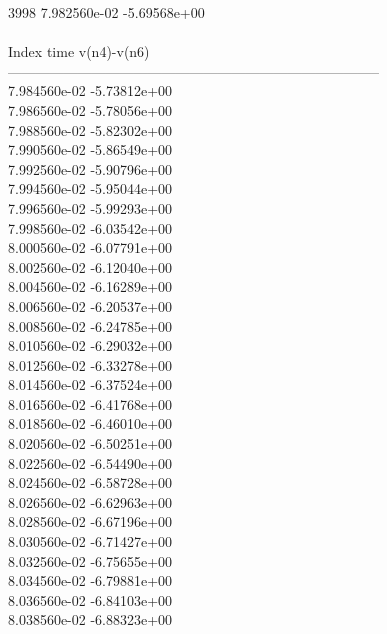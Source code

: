 3998	7.982560e-02	-5.69568e+00	\\ \hline
\\ \hline
Index   time            v(n4)-v(n6)     \\ \hline
--------------------------------------------------------------------------------\\ 	7.984560e-02	-5.73812e+00	\\ 	7.986560e-02	-5.78056e+00	\\ 	7.988560e-02	-5.82302e+00	\\ 	7.990560e-02	-5.86549e+00	\\ 	7.992560e-02	-5.90796e+00	\\ 	7.994560e-02	-5.95044e+00	\\ 	7.996560e-02	-5.99293e+00	\\ 	7.998560e-02	-6.03542e+00	\\ 	8.000560e-02	-6.07791e+00	\\ 	8.002560e-02	-6.12040e+00	\\ 	8.004560e-02	-6.16289e+00	\\ 	8.006560e-02	-6.20537e+00	\\ 	8.008560e-02	-6.24785e+00	\\ 	8.010560e-02	-6.29032e+00	\\ 	8.012560e-02	-6.33278e+00	\\ 	8.014560e-02	-6.37524e+00	\\ 	8.016560e-02	-6.41768e+00	\\ 	8.018560e-02	-6.46010e+00	\\ 	8.020560e-02	-6.50251e+00	\\ 	8.022560e-02	-6.54490e+00	\\ 	8.024560e-02	-6.58728e+00	\\ 	8.026560e-02	-6.62963e+00	\\ 	8.028560e-02	-6.67196e+00	\\ 	8.030560e-02	-6.71427e+00	\\ 	8.032560e-02	-6.75655e+00	\\ 	8.034560e-02	-6.79881e+00	\\ 	8.036560e-02	-6.84103e+00	\\ 	8.038560e-02	-6.88323e+00	\\ \hline
